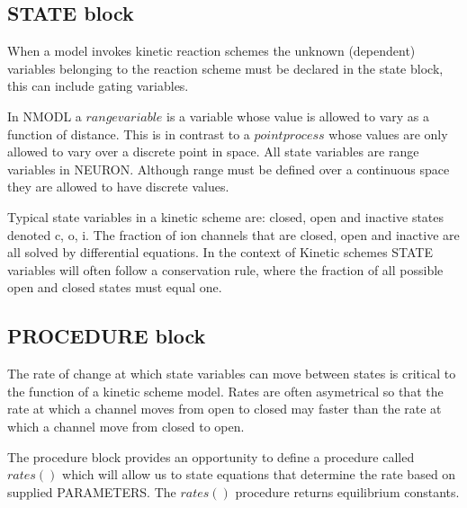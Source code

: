 \documentclass[draftspec]{ninemlspec}
\begin{document}


\subsection{STATE block}

When a model invokes kinetic reaction schemes the unknown (dependent) variables belonging to the reaction scheme must be declared in the state block, this can include gating variables.

In NMODL a $range variable$ is a variable whose value is allowed to vary as a function of distance. This is in contrast to a $point process$ whose values are only allowed to vary over a discrete point in space. All state variables are range variables in NEURON. Although range must be defined over a continuous space they are allowed to have discrete values. 

Typical state variables in a kinetic scheme are: closed, open and inactive states denoted c, o, i. The fraction of ion channels that are closed, open and inactive are all solved by differential equations. In the context of Kinetic schemes STATE variables will often follow a conservation rule, where the fraction of all possible open and closed states must equal one.


\subsection{PROCEDURE block}
The rate of change at which state variables can move between states is critical to the function of a kinetic scheme model. Rates are often asymetrical so that the rate at which a channel moves from open to closed may faster than the rate at which a channel move from closed to open. 

The procedure block provides an opportunity to define a procedure called $rates()$  which will allow us to state equations that determine the rate based on supplied PARAMETERS. The $rates()$ procedure returns equilibrium constants.

 
 
\end{document}
